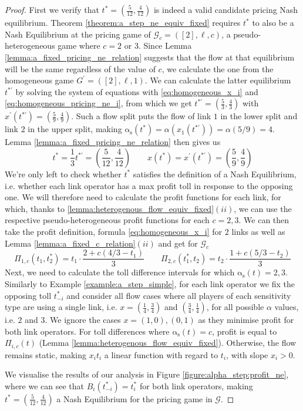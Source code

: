 \documentclass[10pt,a4paper]{book}
\newcommand{\as}{\mathrm{\alpha_s}}
\newcommand{\Gm}{\mathcal{G}}
\theoremstyle{definition}
\theoremstyle{comment}
\begin{document}
\begin{proof}
	First we verify that $t^* = \left(\tfrac{5}{12}, \tfrac{4}{12}\right)$ is indeed a valid candidate pricing Nash equilibrium.
	Theorem \ref{theorem:a_step_ne_equiv_fixed} requires $t^*$ to also be a Nash Equilibrium at the pricing game of $\Gm_c = ([2], \ell, c)$, a pseudo-heterogeneous game where $c = 2$ or $3$.
	Since Lemma \ref{lemma:a_fixed_pricing_ne_relation} suggests that the flow at that equilibrium will be the same regardless of the value of $c$, we calculate the one from the homogeneous game $G^{\prime} = ([2], \ell, 1)$.
	We can calculate the latter equilibrium $t^{*\prime}$ by solving the system of equations with \ref{eq:homogeneous_x_i} and \ref{eq:homogeneous_pricing_ne_i}, from which we get $t^{*\prime} = \left(\tfrac53, \tfrac43\right)$ with $x^\prime(t^{*\prime}) = \left(\tfrac59, \tfrac49\right)$.
	Such a flow split puts the flow of link $1$ in the lower split and link $2$ in the upper split, making $\as(t^*) = \alpha(x_1(t^{*\prime})) = \alpha(5/9) = 4$.
	Lemma \ref{lemma:a_fixed_pricing_ne_relation} then gives us
	\[
		t^* = \frac13 t^{*\prime} = \left(\frac{5}{12}, \frac{4}{12}\right) \qquad x(t^*) = x^\prime(t^{*\prime}) = \left(\frac59, \frac49\right)
	\]
	We're only left to check whether $t^*$ satisfies the definition of a Nash Equilibrium, i.e. whether each link operator has a max profit toll in response to the opposing one.
	We will therefore need to calculate the profit functions for each link, for which, thanks to \ref{lemma:heterogenous_flow_equiv_fixed}$(ii)$, we can use the respective pseudo-heterogeneous profit functions for each $c = 2, 3$.
	We can then take the profit definition, formula \ref{eq:homogeneous_x_i} for $2$ links as well as Lemma \ref{lemma:a_fixed_c_relation}$(ii)$ and get for $\Gm_c$
	\[
		\Pi_{1, c}(t_1, t_2^*) = t_1 \cdot \frac{2 + c (4/3 - t_1)}{3}
		\qquad
		\Pi_{2, c}(t_1^*, t_2) = t_2 \cdot \frac{1 + c (5/3 - t_2)}{3}
	\]
	Next, we need to calculate the toll difference intervals for which $\as(t) = 2, 3$.
	Similarly to Example \ref{example:a_step_simple}, for each link operator we fix the opposing toll $t_{-i}^*$ and consider all flow cases where all players of each sensitivity type are using a single link, i.e. $x = \left(\tfrac14, \tfrac34\right)$ and $\left(\tfrac34, \tfrac14\right)$, for all possible $\alpha$ values, i.e. $2$ and $3$.
	We ignore the cases $x = (1, 0), (0, 1)$ as they minimise profit for both link operators.
	For toll differences where $\as(t) = c$, profit is equal to $\Pi_{i, c}(t)$ (Lemma \ref{lemma:heterogenous_flow_equiv_fixed}).
	Otherwise, the flow remains static, making $x_i t_i$ a linear function with regard to $t_i$, with slope $x_i > 0$.
	
	We visualise the results of our analysis in Figure \ref{figure:alpha_step:profit_ne}, where we can see that $B_i(t_{-i}^*) = t_i^*$ for both link operators, making $t^* = \left(\tfrac{5}{12}, \tfrac{4}{12}\right)$ a Nash Equilibrium for the pricing game in $\Gm$.
\end{proof}
\end{document}
